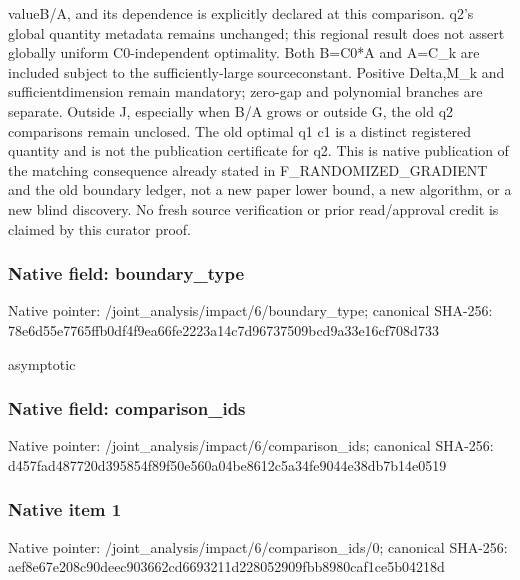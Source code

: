 \documentclass[10pt,a4paper]{article}
\begin{document}
valueB/\allowbreak{}A,\allowbreak{} and its dependence is explicitly declared at this comparison. q2's global quantity metadata remains unchanged;\allowbreak{} this regional result does not assert globally uniform C0-independent optimality. Both B=\allowbreak{}C0*A and A=\allowbreak{}C\_\allowbreak{}k are included subject to the sufficiently-large sourceconstant. Positive Delta,\allowbreak{}M\_\allowbreak{}k and sufficientdimension remain mandatory;\allowbreak{} zero-gap and polynomial branches are separate. Outside J,\allowbreak{} especially when B/\allowbreak{}A grows or outside G,\allowbreak{} the old q2 comparisons remain unclosed. The old optimal q1 c1 is a distinct registered quantity and is not the publication certificate for q2. This is native publication of the matching consequence already stated in F\_\allowbreak{}RANDOMIZED\_\allowbreak{}GRADIENT and the old boundary ledger,\allowbreak{} not a new paper lower bound,\allowbreak{} a new algorithm,\allowbreak{} or a new blind discovery. No fresh source verification or prior read/\allowbreak{}approval credit is claimed by this curator proof.\par\endgroup

\subsubsection{Native field: boundary\_\allowbreak{}type}
Native pointer: /joint\_\allowbreak{}analysis/impact/6/boundary\_\allowbreak{}type; canonical SHA-256: 78e6d55e7765ffb0df4f9ea66fe2223a14c7d96737509bcd9a33e16cf708d733

\begingroup\raggedright\sloppy asymptotic\par\endgroup

\subsubsection{Native field: comparison\_\allowbreak{}ids}
Native pointer: /joint\_\allowbreak{}analysis/impact/6/comparison\_\allowbreak{}ids; canonical SHA-256: d457fad487720d395854f89f50e560a04be8612c5a34fe9044e38db7b14e0519

\subsubsection{Native item 1}
Native pointer: /joint\_\allowbreak{}analysis/impact/6/comparison\_\allowbreak{}ids/0; canonical SHA-256: aef8e67e208c90deec903662cd6693211d228052909fbb8980caf1ce5b04218d
\end{document}
